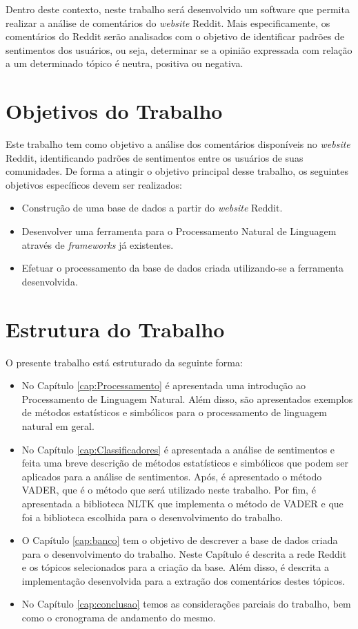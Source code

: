 Dentro deste contexto, neste trabalho será desenvolvido um software que permita
realizar a análise de comentários do \textit{website} Reddit. Mais
especificamente, os comentários do Reddit serão analisados com o objetivo de
identificar padrões de sentimentos dos usuários, ou seja, determinar se a
opinião expressada com relação a um determinado tópico é neutra, positiva ou negativa.

\section{Objetivos do Trabalho}

Este trabalho tem como objetivo a análise dos comentários disponíveis no
\textit{website} Reddit, identificando padrões de sentimentos entre os
usuários de suas comunidades. De forma a atingir o objetivo principal desse
trabalho, os seguintes objetivos específicos devem ser realizados:
\begin{itemize}
  
 \item Construção de uma base de dados a partir do \textit{website} Reddit.
 \item Desenvolver uma ferramenta para o Processamento Natural de Linguagem
 através de \textit{frameworks} já existentes.
 \item Efetuar o processamento da base de dados criada utilizando-se a
 ferramenta desenvolvida.
\end{itemize}

\section{Estrutura do Trabalho}

O presente trabalho está estruturado da seguinte forma: 
\begin{itemize}
  \item No Capítulo \ref{cap:Processamento} é apresentada uma introdução ao
  Processamento de Linguagem Natural. Além disso, são apresentados exemplos de
  métodos estatísticos e simbólicos para o processamento de linguagem natural
  em geral.
  \item No Capítulo \ref{cap:Classificadores} é
  apresentada a análise de sentimentos e feita uma breve descrição de métodos
  estatísticos e simbólicos que podem ser aplicados para a análise de
  sentimentos. Após, é apresentado o método \ac{VADER}, que é o método que será
  utilizado neste trabalho. Por fim, é apresentada a biblioteca \ac{NLTK} que implementa o método de
  \ac{VADER} e que foi a biblioteca escolhida para o desenvolvimento do
  trabalho.
  \item O Capítulo \ref{cap:banco} tem
o objetivo de descrever a base de dados criada para o desenvolvimento do
trabalho.
Neste Capítulo é descrita a rede Reddit e os tópicos selecionados para a criação
da base. Além disso, é descrita a implementação desenvolvida para a extração dos
comentários destes tópicos.
\item No Capítulo \ref{cap:conclusao} temos as considerações parciais do
trabalho, bem como o cronograma de andamento do mesmo.
\end{itemize}

